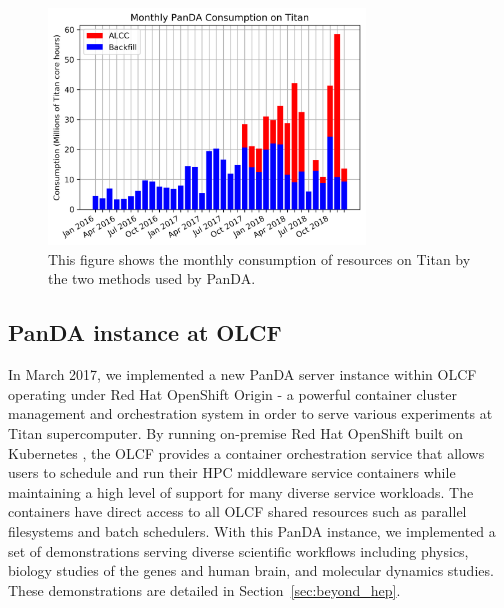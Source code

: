 \begin{figure}
  \includegraphics[width=0.75\textwidth]{images/monthly-consumption.png}
\caption{This figure shows the monthly consumption of resources on Titan by the
two methods used by PanDA.}
\label{fig:monthly-consumption}
\end{figure}


\subsection{PanDA instance at OLCF}
\label{subsec:panda_instance}

In March 2017, we implemented a new PanDA server instance within OLCF operating
under Red Hat OpenShift Origin \cite{RH_OpenShift} - a powerful container
cluster management and orchestration system in order to serve various
experiments at Titan supercomputer. By running on-premise Red Hat OpenShift
built on Kubernetes \cite{Kubernetes}, the OLCF provides a container
orchestration service that allows users to schedule and run their HPC
middleware service containers while maintaining a high level of support for
many diverse service workloads. The containers have direct access to all OLCF
shared resources such as parallel filesystems and batch schedulers. With this
PanDA instance, we implemented a set of demonstrations serving diverse
scientific workflows including physics, biology studies of the genes and human
brain, and molecular dynamics studies. These demonstrations are detailed in
Section~\ref{sec:beyond_hep}.


